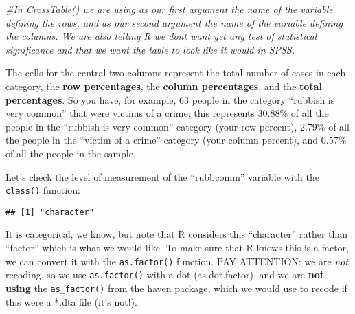 \documentclass[
]{book}
\newenvironment{Shaded}{\begin{snugshade}}{\end{snugshade}}
\newcommand{\CommentTok}[1]{\textcolor[rgb]{0.56,0.35,0.01}{\textit{#1}}}
\newcommand{\FunctionTok}[1]{\textcolor[rgb]{0.13,0.29,0.53}{\textbf{#1}}}
\newcommand{\NormalTok}[1]{#1}
\newcommand{\OtherTok}[1]{\textcolor[rgb]{0.56,0.35,0.01}{#1}}
\newcommand{\SpecialCharTok}[1]{\textcolor[rgb]{0.81,0.36,0.00}{\textbf{#1}}}
\begin{document}
\begin{Shaded}
\begin{Highlighting}[]
\CommentTok{\#In CrossTable() we are using as our first argument the name of the variable defining the rows, and as our second argument the name of the variable defining the columns. We are also telling R we don\textquotesingle{}t want yet any test of statistical significance and that we want the table to look like it would in SPSS.}
\end{Highlighting}
\end{Shaded}

The cells for the central two columns represent the total number of cases in each category, the \textbf{row percentages}, the \textbf{column percentages}, and the \textbf{total percentages}. So you have, for example, 63 people in the category ``rubbish is very common'' that were victims of a crime; this represents 30.88\% of all the people in the ``rubbish is very common'' category (your row percent), 2.79\% of all the people in the ``victim of a crime'' category (your column percent), and 0.57\% of all the people in the sample.

Let's check the level of measurement of the ``rubbcomm'' variable with the \texttt{class()} function:

\begin{Shaded}
\end{Shaded}

\begin{verbatim}
## [1] "character"
\end{verbatim}

It is categorical, we know, but note that R considers this ``character'' rather than ``factor'' which is what we would like. To make sure that R knows this is a factor, we can convert it with the \texttt{as.factor()} function. PAY ATTENTION: we are \emph{not} recoding, so we use \texttt{as.factor()} with a dot (as.dot.factor), and we are \textbf{not using} the \texttt{as\_factor()} from the haven package, which we would use to recode if this were a *.dta file (it's not!).

\begin{Shaded}
\end{Shaded}
\end{document}
